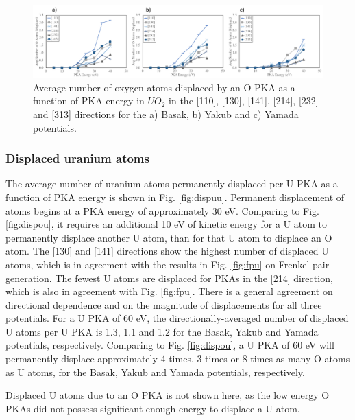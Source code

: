 \documentclass[8pt]{article}   	%
\begin{document}
\begin{figure}[h]
 \centering
 \includegraphics[width=1.0\textwidth]{dispO_O.png} 
 \caption{Average number of oxygen atoms displaced by an O PKA as a function of PKA energy in $UO_2$ in the [110], [130], [141], [214], [232] and [313] directions for the a) Basak, b) Yakub and c) Yamada potentials.   }
 \label{fig:dispoo}
\end{figure}

\FloatBarrier

\subsubsection{Displaced uranium atoms}
\hspace{5mm}

The average number of uranium atoms permanently displaced per U PKA as a function of PKA energy is shown in Fig. \ref{fig:dispuu}. Permanent displacement of atoms begins at a PKA energy of approximately 30 eV. Comparing to Fig. \ref{fig:dispou}, it requires an additional 10 eV of kinetic energy for a U atom to permanently displace another U atom, than for that U atom to displace an O atom. The [130] and [141] directions show the highest number of displaced U atoms, which is in agreement with the results in Fig. \ref{fig:fpu} on Frenkel pair generation. The fewest U atoms are displaced for PKAs in the [214] direction, which is also in agreement with Fig. \ref{fig:fpu}. There is a general agreement on directional dependence and on the magnitude of displacements for all three potentials. For a U PKA of 60 eV, the directionally-averaged number of displaced U atoms per U PKA is 1.3, 1.1 and 1.2 for the Basak, Yakub and Yamada potentials, respectively. Comparing to Fig. \ref{fig:dispou}, a U PKA of 60 eV will permanently displace approximately 4 times, 3 times or 8 times as many O atoms as U atoms, for the Basak, Yakub and Yamada potentials, respectively.

Displaced U atoms due to an O PKA is not shown here, as the low energy O PKAs did not possess significant enough energy to displace a U atom. 
\end{document}
